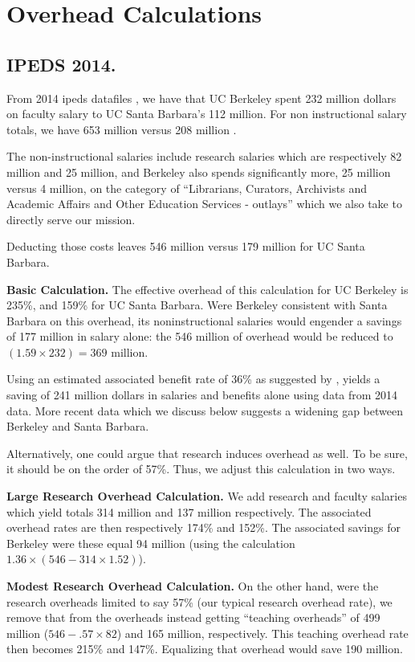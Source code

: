 \documentclass{article}
\begin{document}
\section{Overhead Calculations}

\subsection{IPEDS 2014.}

From 2014 ipeds datafiles \cite{ipeds-is}, we have that UC
Berkeley spent 232 million dollars on faculty salary to UC Santa
Barbara's 112 million.  For non instructional salary totals,
we have 653 million versus 208 million \cite{ipeds-nis}. 

The non-instructional salaries include research salaries which are
respectively 82 million and 25 million, and Berkeley also spends
significantly more, 25 million versus 4 million, on the category of
``Librarians, Curators, Archivists and Academic Affairs and Other
Education Services - outlays'' which we also take to directly serve
our mission.  

Deducting those costs leaves 546 million versus 179 million for 
UC Santa Barbara. 

{\bf Basic Calculation.} The effective overhead of this calculation for UC Berkeley is 235\%,
and 159\% for UC Santa Barbara.  Were Berkeley consistent with Santa
Barbara on this overhead, its noninstructional salaries would engender
a savings of 177 million in salary alone: the 546 million of overhead would
be reduced to $(1.59 \times 232) = 369$ million. 

Using an estimated associated benefit rate of 36\% as suggested by
\cite{rev-trends},  yields a saving of 241 million dollars in
salaries and benefits alone using data from 2014 data.  More recent
data which we discuss below suggests a widening gap between Berkeley
and Santa Barbara.

Alternatively, one could argue that research induces overhead
as well.  To be sure, it should be on the order of 57\%. Thus,
we adjust this calculation in two ways. 

{\bf Large Research Overhead Calculation.} We add research and faculty
salaries which yield totals 314 million and 137 million
respectively. The associated overhead rates are then respectively
174\% and 152\%.  The associated savings for Berkeley were these equal
94 million (using the calculation $1.36\times (546 - 314\times1.52)$).

{\bf Modest Research Overhead Calculation.} On the other hand, were
the research overheads limited to say 57\% (our typical research
overhead rate), we remove that from the overheads instead getting
``teaching overheads'' of 499 million ($546 - .57\times 82$) and 165
million, respectively.  This teaching overhead rate then becomes 215\%
and 147\%.  Equalizing that overhead would save 190 million.
\end{document}
